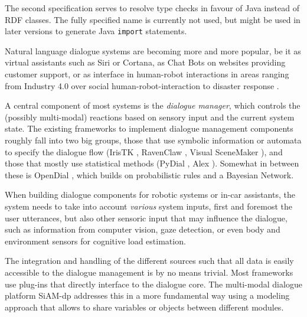 The second specification serves to resolve type checks in favour of Java
instead of RDF classes. The fully specified name is currently not used, but
might be used in later versions to generate Java \texttt{import} statements.


Natural language dialogue systems are becoming more and more popular, be it as
virtual assistants such as Siri or Cortana, as Chat Bots on websites providing
customer support, or as interface in human-robot interactions in areas ranging
from Industry 4.0 \citep{schwartz2016hybrid} over social human-robot-interaction
\citep{alize2010} to disaster response \citep{kruijff2015tradr}.

A central component of most systems is the \emph{dialogue manager}, which
controls the (possibly multi-modal) reactions based on sensory input and the
current system state. The existing frameworks to implement dialogue management
components roughly fall into two big groups, those that use symbolic
information or automata to specify the dialogue flow (IrisTK
\citep{2012iristk}, RavenClaw \citep{bohus2009ravenclaw}, Visual SceneMaker
\citep{gebhard2012visual}), and those that mostly use statistical methods
(PyDial \cite{ultes2017pydial}, Alex \citep{jurvcivcek2014alex}). Somewhat in
between these is OpenDial \citep{lison2015developing}, which builds on
probabilistic rules and a Bayesian Network.

When building dialogue components for robotic systems or in-car assistants, the system
needs to take into account \emph{various} system inputs, first and foremost the
user utterances, but also other sensoric input that may influence the dialogue,
such as information from computer vision, gaze detection, or even body and
environment sensors for cognitive load estimation.

The integration and handling of the different sources such that all data is
easily accessible to the dialogue management is by no means trivial. Most
frameworks use plug-ins that directly interface to the dialogue core. The
multi-modal dialogue platform SiAM-dp \citep{nesselrath2014siam}
addresses this in a more fundamental way using a modeling approach that allows
to share variables or objects between different modules.

